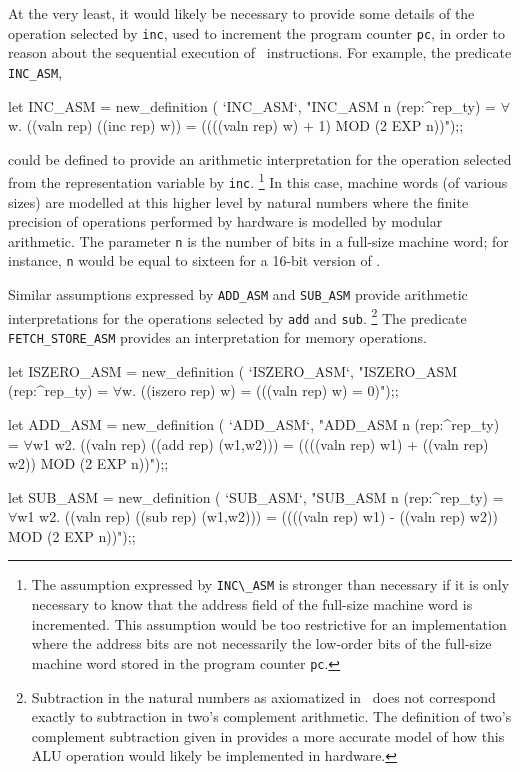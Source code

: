 At the very least, it would likely be necessary to
provide some details of the operation selected by \verb"inc",
used to increment the program counter \verb"pc", in order to reason
about the sequential execution of \Tamarack\ instructions.
For example, the predicate \verb"INC_ASM",

\begintt
let INC_ASM = new_definition (
  `INC_ASM`,
  "INC_ASM n (rep:^rep_ty) =
    \(\forall\)w. ((valn rep) ((inc rep) w)) = ((((valn rep) w) + 1) MOD (2 EXP n))");;
\endtt

\noindent
could be defined to
provide an arithmetic interpretation for the operation selected from
the representation variable by \verb"inc".
\footnote{
The assumption expressed by \verb"INC\_ASM" is stronger than
necessary if it is only necessary to know that the address field
of the full-size machine word is incremented.
This assumption would be too restrictive for an
implementation where
the address bits are not necessarily the low-order bits of the full-size
machine word stored in the program counter \verb"pc".}
In this case,
machine words (of various sizes) are modelled at this higher level
by natural numbers where
the finite precision of operations performed by hardware
is modelled by modular arithmetic.
The parameter \verb"n" is the
number of bits in a full-size machine word;
for instance, \verb"n" would be equal to sixteen for a \mbox{16-bit} version
of \Tamarack.

Similar assumptions expressed by
\verb"ADD_ASM" and \verb"SUB_ASM" provide arithmetic
interpretations for the operations selected by \verb"add" and \verb"sub".
\footnote{
Subtraction in the natural numbers as axiomatized in \HOL\
does not correspond
exactly to subtraction in two's complement arithmetic.
The definition of two's complement subtraction given in
\cite{Joyce:pisa} provides a more accurate model of
how this ALU operation would likely be implemented in hardware.}
The predicate \verb"FETCH_STORE_ASM" provides an interpretation
for memory operations.

\begintt
let ISZERO_ASM = new_definition (
`ISZERO_ASM`,
  "ISZERO_ASM (rep:^rep_ty) =
    \(\forall\)w. ((iszero rep) w) = (((valn rep) w) = 0)");;

let ADD_ASM = new_definition (
  `ADD_ASM`,
  "ADD_ASM n (rep:^rep_ty) =
    \(\forall\)w1 w2.
      ((valn rep) ((add rep) (w1,w2))) =
        ((((valn rep) w1) + ((valn rep) w2)) MOD (2 EXP n))");;

let SUB_ASM = new_definition (
  `SUB_ASM`,
  "SUB_ASM n (rep:^rep_ty) =
    \(\forall\)w1 w2.
      ((valn rep) ((sub rep) (w1,w2))) =
        ((((valn rep) w1) - ((valn rep) w2)) MOD (2 EXP n))");;


